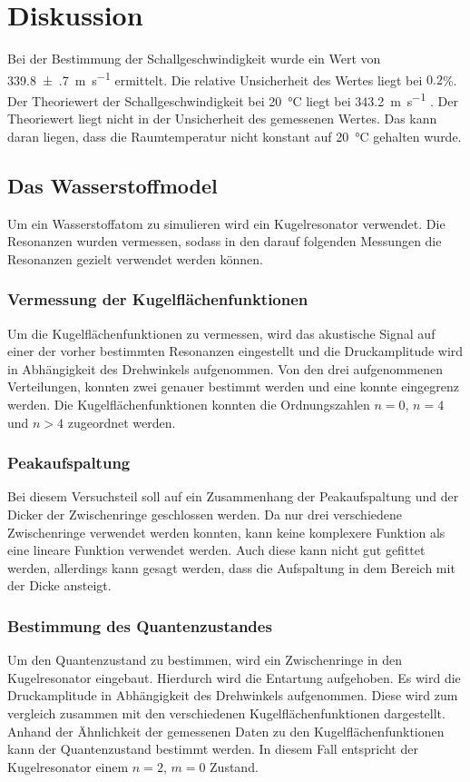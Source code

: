 \section{Diskussion}
\label{sec:Diskussion}
Bei der Bestimmung der Schallgeschwindigkeit wurde ein Wert von \SI{339.8(7)}{\meter\per\second} ermittelt. 
Die relative Unsicherheit des Wertes liegt bei $\num{0.2}$\%. Der Theoriewert der Schallgeschwindigkeit bei 
\SI{20}{\celsius} liegt bei \SI{343.2}{\meter\per\second} \cite{Schallgeschwindigkeit}. Der Theoriewert liegt nicht in der Unsicherheit des 
gemessenen Wertes. Das kann daran liegen, dass die Raumtemperatur nicht konstant auf \SI{20}{\celsius} gehalten wurde.

\subsection{Das Wasserstoffmodel}
Um ein Wasserstoffatom zu simulieren wird ein Kugelresonator verwendet. Die Resonanzen wurden vermessen, sodass in den darauf 
folgenden Messungen die Resonanzen gezielt verwendet werden können.
\subsubsection{Vermessung der Kugelflächenfunktionen}
Um die Kugelflächenfunktionen zu vermessen, wird das akustische Signal auf einer der vorher bestimmten Resonanzen eingestellt 
und die Druckamplitude wird in Abhängigkeit des Drehwinkels aufgenommen.
Von den drei aufgenommenen Verteilungen, konnten zwei genauer bestimmt werden und eine konnte eingegrenz werden.
Die Kugelflächenfunktionen konnten die Ordnungszahlen $n=0$, $n=4$ und $n>4$ zugeordnet werden.
\subsubsection{Peakaufspaltung}
Bei diesem Versuchsteil soll auf ein Zusammenhang der Peakaufspaltung und der Dicker der Zwischenringe geschlossen werden.
Da nur drei verschiedene Zwischenringe verwendet werden konnten, kann keine komplexere Funktion als eine lineare Funktion 
verwendet werden. Auch diese kann nicht gut gefittet werden, allerdings kann gesagt werden, dass die Aufspaltung in dem Bereich
mit der Dicke ansteigt. 
\subsubsection{Bestimmung des Quantenzustandes}
Um den Quantenzustand zu bestimmen, wird ein Zwischenringe in den Kugelresonator eingebaut. Hierdurch wird die 
Entartung aufgehoben. 
Es wird die Druckamplitude in Abhängigkeit des Drehwinkels aufgenommen. Diese wird zum vergleich zusammen mit den verschiedenen
Kugelflächenfunktionen dargestellt.
Anhand der Ähnlichkeit der gemessenen Daten zu den Kugelflächenfunktionen kann der Quantenzustand bestimmt werden.
In diesem Fall entspricht der Kugelresonator einem $n=2$, $m=0$ Zustand.
